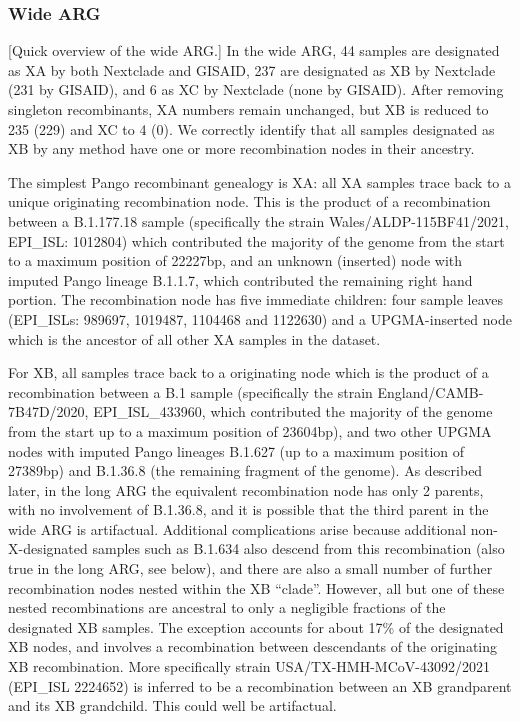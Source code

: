 \documentclass{article}
\begin{document}
\subsubsection{Wide ARG}
[Quick overview of the wide ARG.]
In the wide ARG, 44 samples are designated as XA by both Nextclade and GISAID, 237 are designated as XB by Nextclade (231 by GISAID), and 6 as XC by Nextclade (none by GISAID). After removing singleton recombinants, XA numbers remain unchanged, but XB is reduced to 235 (229) and XC to 4 (0). We correctly identify that all samples designated as XB by any method have one or more recombination nodes in their ancestry.

The simplest Pango recombinant genealogy is XA: all XA samples trace back to a unique originating recombination node. This is the product of a recombination between a B.1.177.18 sample (specifically the strain Wales/ALDP-115BF41/2021, EPI\_ISL: 1012804) which contributed the majority of the genome from the start to a maximum position of 22227bp, and an unknown (inserted) node with imputed Pango lineage B.1.1.7, which contributed the remaining right hand portion. The recombination node has five immediate children: four sample leaves (EPI\_ISLs: 989697, 1019487, 1104468 and 1122630) and a UPGMA-inserted node which is the ancestor of all other XA samples in the dataset.

For XB, all samples trace back to a originating node which is the product of a recombination between a B.1 sample (specifically the strain England/CAMB-7B47D/2020, EPI\_ISL\_433960, which contributed the majority of the genome from the start up to a maximum position of 23604bp), and two other UPGMA nodes with imputed Pango lineages B.1.627 (up to a maximum position of 27389bp) and B.1.36.8 (the remaining fragment of the genome). As described later, in the long ARG the equivalent recombination node has only 2 parents, with no involvement of  B.1.36.8, and it is possible that the third parent in the wide ARG is artifactual. Additional complications arise because additional non-X-designated samples such as B.1.634 also descend from this recombination (also true in the long ARG, see below), and there are also a small number of further recombination nodes nested within the XB ``clade''. However, all but one of these nested recombinations are ancestral to only a negligible fractions of the designated XB samples. The exception accounts for about 17\% of the designated XB nodes, and involves a recombination between descendants of the originating XB recombination. More specifically strain USA/TX-HMH-MCoV-43092/2021 (EPI\_ISL 2224652) is inferred to be a recombination between an XB grandparent and its XB grandchild. This could well be artifactual.
\end{document}
